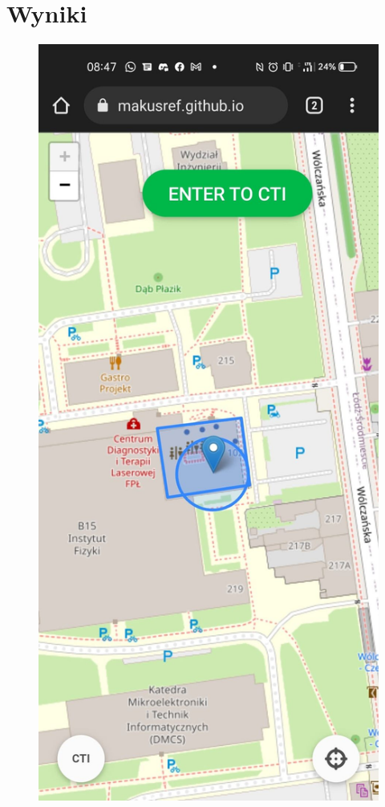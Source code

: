 \documentclass{classrep}
\begin{document}
\section{Wyniki}
{
\begin{figure}[ht]

    \centering

  \includegraphics[scale=0.2]{photo1.png}


\end{figure}}
\end{document}
